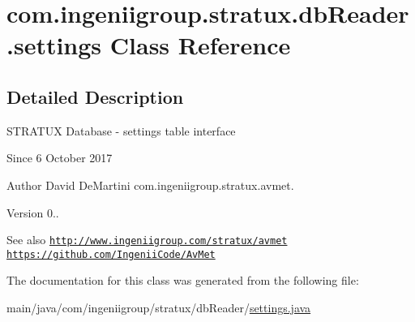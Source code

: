 \hypertarget{classcom_1_1ingeniigroup_1_1stratux_1_1db_reader_1_1settings}{}\section{com.\+ingeniigroup.\+stratux.\+db\+Reader.\+settings Class Reference}
\label{classcom_1_1ingeniigroup_1_1stratux_1_1db_reader_1_1settings}


\subsection{Detailed Description}
S\+T\+R\+A\+T\+UX Database -\/ settings table interface

\begin{DoxySince}{Since}
6 October 2017 
\end{DoxySince}
\begin{DoxyAuthor}{Author}
David De\+Martini  com.\+ingeniigroup.\+stratux.\+avmet. 
\end{DoxyAuthor}
\begin{DoxyVersion}{Version}
0.. 
\end{DoxyVersion}
\begin{DoxySeeAlso}{See also}
\href{http://www.ingeniigroup.com/stratux/avmet}{\tt http\+://www.\+ingeniigroup.\+com/stratux/avmet}  \href{https://github.com/IngeniiCode/AvMet}{\tt https\+://github.\+com/\+Ingenii\+Code/\+Av\+Met} 
\end{DoxySeeAlso}


The documentation for this class was generated from the following file\+:\begin{DoxyCompactItemize}
\item 
main/java/com/ingeniigroup/stratux/db\+Reader/\hyperlink{settings_8java}{settings.\+java}\end{DoxyCompactItemize}
